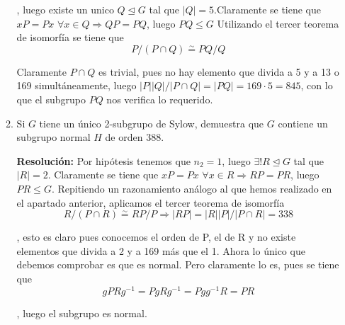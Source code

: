 \documentclass{article}
\begin{document}
\begin{enumerate}
\begin{enumerate}
, luego existe un unico $Q\unlhd G$ tal que $|Q|=5$.Claramente se tiene que $xP=Px$ $\forall x\in Q\Rightarrow QP=PQ$, luego $PQ\leq G$ Utilizando el tercer teorema de isomorfía se tiene que
\begin{equation*}
P/(P\cap Q)\overset{\sim}{=} PQ/Q
\end{equation*}

Claramente $P\cap Q$ es trivial, pues no hay elemento que divida a 5 y a 13 o 169 simultáneamente, luego $|P||Q|/|P\cap Q|=|PQ|=169\cdot 5=845$, con lo que el subgrupo $PQ$ nos verifica lo requerido.

	\item Si $G$ tiene un único 2-subgrupo de Sylow, demuestra que $G$ contiene un subgrupo normal $H$ de orden 388.
	
	\textbf{Resolución:} Por hipótesis tenemos que $n_2=1$, luego $\exists ! R\unlhd G$ tal que $|R|=2$. Claramente se tiene que $xP=Px$ $\forall x\in R\Rightarrow RP=PR$, luego $PR\leq G$. Repitiendo un razonamiento análogo al que hemos realizado en el apartado anterior, aplicamos el tercer teorema de isomorfía
	\begin{equation*}
	R/(P\cap R)\overset{\sim}{=} RP/P\Rightarrow |RP|=|R||P|/|P\cap R|=338
	\end{equation*}
	
	, esto es claro pues conocemos el orden de P, el de R y no existe elementos que divida a 2 y a 169 más que el 1. Ahora lo único que debemos comprobar es que es normal. Pero claramente lo es, pues se tiene que
	\begin{equation*}
	gPRg^{-1}=PgRg^{-1}=Pgg^{-1}R=PR
	\end{equation*}
	
	, luego el subgrupo es normal.
	\end{enumerate}
\end{enumerate}
\end{document}
